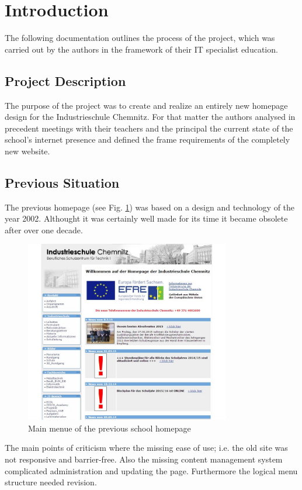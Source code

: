 \section{Introduction}
\label{sec:Introduction}

The following documentation outlines the process of the project, which was carried out by the authors
in the framework of their IT specialist education.

\subsection{Project Description}
\label{sec:ProjectDescription}
The purpose of the project was to create and realize an entirely new homepage design for the In\-dus\-trie\-schu\-le Chemnitz. For 
that matter the authors analysed in precedent meetings with their teachers and the principal the current state of the school's
 internet presence and defined the frame requirements of the completely new website.

\subsection{Previous Situation}
\label{sec:PreviousSituation}
The previous homepage (see Fig. \ref{fig:pageOld}) was based on a design and technology of the year 2002. Althought it was certainly well made for its time
it became obsolete after over one decade.
\begin{figure}[ht]
	\centering
	\includegraphics[width=0.80\textwidth]{./Bilder/oldpage.jpg}
	\caption{Main menue of the previous school homepage}
	\label{fig:pageOld}
\end{figure}
The main points of criticism where the missing ease of use; i.e. the old site was not responsive and barrier-free. Also 
the missing content management system complicated administration and updating the page. Furthermore the logical 
menu structure needed revision.

